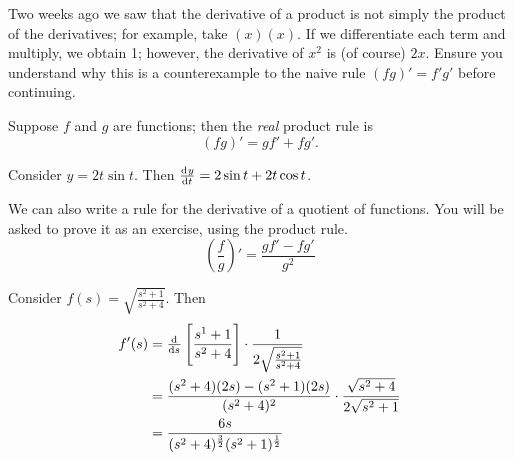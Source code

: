 


Two weeks ago we saw that the derivative of a product is not simply the product of the derivatives;
for example, take $ (x)(x) $. If we differentiate each term and multiply, we obtain 1; however,
the derivative of $ x^2 $ is (of course) $ 2x $. Ensure you understand why this is a counterexample
to the naive rule $ (fg)' = f'g' $ before continuing.

Suppose $ f $ and $ g $ are functions; then the \textit{real} product rule is
\begin{displaymath}
  (fg)' = gf' + fg'.
\end{displaymath}

\begin{ex}
  Consider $ y = 2t \sin t $. Then $ \od{y}{t} = 2 \sin t + 2t \cos t $.
\end{ex}

We can also write a rule for the derivative of a quotient of functions. You will be asked to
prove it as an exercise, using the product rule.
\begin{displaymath}
  \left( \frac{f}{g} \right)' = \frac{gf' - fg'}{g^2}
\end{displaymath}

\begin{ex}
  Consider $ f(s) = \sqrt{\frac{s^2 + 1}{s^2 + 4}} $. Then
  \begin{align*}
    f'(s) &= \od{}{s} \left[ \frac{s^1 + 1}{s^2 + 4} \right] \cdot \frac{1}{2\sqrt{\frac{s^2 + 1}{s^2 + 4}}}\\
          &= \frac{(s^2 + 4)(2s) - (s^2 + 1)(2s)}{(s^2 + 4)^2} \cdot \frac{\sqrt{s^2 + 4}}{2\sqrt{s^2 + 1}}\\
          &= \frac{6s}{(s^2 + 4)^{\frac{3}{2}} (s^2 + 1)^{\frac{1}{2}}}
  \end{align*}
\end{ex}

